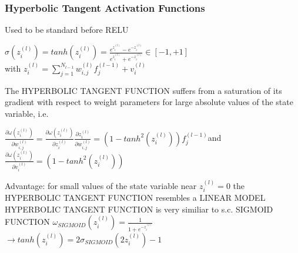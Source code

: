 \begin{sectionbox}
\subsubsection*{Hyperbolic Tangent Activation Functions}
Used to be standard before RELU
\begin{emphbox}
$ \sigma(z_i^{(l)})=tanh(z_i^{(l)})=\frac{e^{z_i^{(l)}}-e^{-z_i^{(l)}}}{e^{z_i^{(l)}}+e^{-z_i^{(l)}}} \in [-1,+1]$\\
with $z_i^{(l)}=\sum_{j=1}^{N_{l-1}}w_{i,j}^{(l)}f_j^{(l-1)}+v_i^{(l)}$
\end{emphbox}
The HYPERBOLIC TANGENT FUNCTION suffers from a saturation of its gradient with respect to weight parameters for large absolute values of the state variable, i.e.
\begin{emphbox}
$\frac{\partial \omega(z_i^{(l)})}{\partial w_{i,j}^{(l)}}=\frac{\partial\omega(z_i^{(l)})}{\partial z_i^{(l)}}\frac{\partial z_i^{(l)}}{\partial w_{i,j}^{(l)}}=(1-tanh^2(z_i^{(l)}))f_j^{(l-1)}$and\\
$\frac{\partial \omega(z_i^{(l)})}{\partial v_{i}^{(l)}}=(1-tanh^2(z_i^{(l)}))$
\end{emphbox}
Advantage: for small values of the state variable near $z_i^{(l)}=0$ the HYPERBOLIC TANGENT FUNCTION resembles a LINEAR MODEL\\

HYPERBOLIC TANGENT FUNCTION is very similiar to s.c. SIGMOID FUNCTION $\omega_{SIGMOID}(z_i^{(l)})=\frac{1}{1+e^{-z_i^{(l)}}}$\\
$\rightarrow tanh(z_i^{(l)})=2\sigma_{SIGMOID}(2z_i^{(l)})-1$\\

\end{sectionbox}
